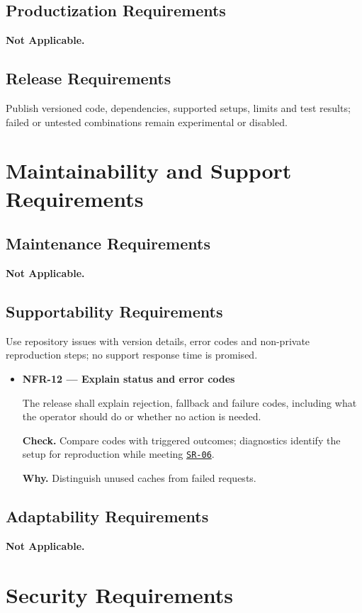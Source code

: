 \documentclass[12pt]{article}
\begin{document}
\subsection{Productization Requirements}
\textbf{Not Applicable.}


\subsection{Release Requirements}
Publish versioned code, dependencies, supported setups, limits and test
results; failed or untested combinations remain experimental or disabled.


\section{Maintainability and Support Requirements}


\subsection{Maintenance Requirements}
\textbf{Not Applicable.}


\subsection{Supportability Requirements}
Use repository issues with version details, error codes and non-private reproduction steps; no support response time is promised.

\begin{itemize}
\item {}\label{req:NFR-12}
\textbf{NFR-12 --- Explain status and error codes}\par
The release shall explain rejection, fallback and failure codes, including what the operator should do or whether no action is needed.\par
\textbf{Check.} Compare codes with triggered outcomes; diagnostics identify the setup for reproduction while meeting \hyperref[req:SR-06]{\texttt{SR-06}}.\par
\textbf{Why.} Distinguish unused caches from failed requests.
\end{itemize}

\subsection{Adaptability Requirements}
\textbf{Not Applicable.}


\section{Security Requirements}
\end{document}
